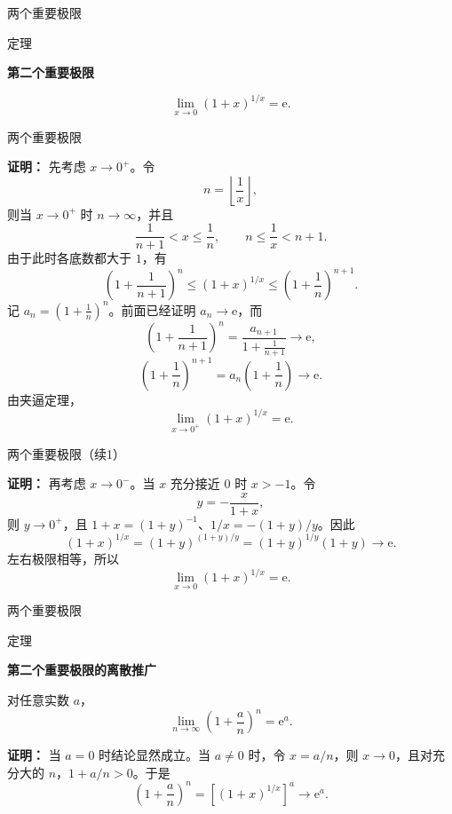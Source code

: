 \documentclass[aspectratio=169,10pt,fontset=fandol]{ctexbeamer}
\newcommand{\ee}{\mathrm{e}}
\begin{document}
\begin{frame}[t,fragile]{两个重要极限}
\footnotesize
\begin{block}{定理}
{\footnotesize
\textbf{第二个重要极限}\par

\[
\lim_{x\to0}(1+x)^{1/x}=\ee.
\]

}
\end{block}
\end{frame}
\begin{frame}[t,fragile]{两个重要极限}
\footnotesize
{\footnotesize
\textbf{证明：}
先考虑 \(x\to0^+\)。令
\[
n=\left\lfloor\frac1x\right\rfloor,
\]
则当 \(x\to0^+\) 时 \(n\to\infty\)，并且
\[
\frac1{n+1}<x\leq\frac1n,\qquad n\leq\frac1x<n+1.
\]
由于此时各底数都大于 \(1\)，有
\[
\left(1+\frac1{n+1}\right)^n
\leq(1+x)^{1/x}
\leq\left(1+\frac1n\right)^{n+1}.
\]
记 \(a_n=(1+\frac1n)^n\)。前面已经证明 \(a_n\to\ee\)，而
\[
\left(1+\frac1{n+1}\right)^n
=\frac{a_{n+1}}{1+\frac1{n+1}}\to\ee,
\]
\[
\left(1+\frac1n\right)^{n+1}
=a_n\left(1+\frac1n\right)\to\ee.
\]
由夹逼定理，
\[
\lim_{x\to0^+}(1+x)^{1/x}=\ee.
\]


}
\end{frame}
\begin{frame}[t,fragile]{两个重要极限（续1）}
\footnotesize
{\footnotesize
\textbf{证明：}
再考虑 \(x\to0^-\)。当 \(x\) 充分接近 \(0\) 时 \(x>-1\)。令
\[
y=-\frac{x}{1+x},
\]
则 \(y\to0^+\)，且 \(1+x=(1+y)^{-1}\)、\(1/x=-(1+y)/y\)。因此
\[
(1+x)^{1/x}
=(1+y)^{(1+y)/y}
=(1+y)^{1/y}(1+y)\to\ee.
\]
左右极限相等，所以
\[
\lim_{x\to0}(1+x)^{1/x}=\ee.
\]

}
\end{frame}
\begin{frame}[t,fragile]{两个重要极限}
\footnotesize
\begin{block}{定理}
{\footnotesize
\textbf{第二个重要极限的离散推广}\par

对任意实数 \(a\)，
\[
\lim_{n\to\infty}\left(1+\frac an\right)^n=\ee^a.
\]

}
\end{block}
\pause
{\footnotesize
\textbf{证明：}
当 \(a=0\) 时结论显然成立。当 \(a\neq0\) 时，令 \(x=a/n\)，则 \(x\to0\)，且对充分大的 \(n\)，\(1+a/n>0\)。于是
\[
\left(1+\frac an\right)^n
=\left[(1+x)^{1/x}\right]^a\longrightarrow\ee^a.
\]

}
\end{frame}
\end{document}
